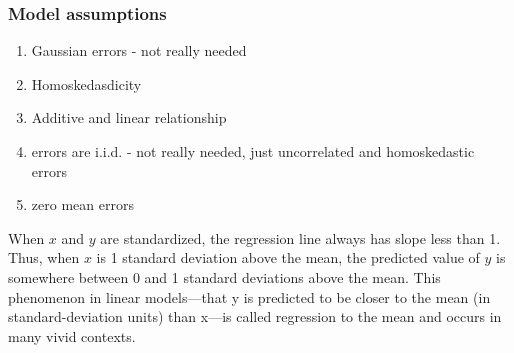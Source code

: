 \documentclass{article}
\begin{document}
\subsubsection{Model assumptions}
\begin{enumerate}
  \item Gaussian errors - not really needed
  \item Homoskedasdicity
  \item Additive and linear relationship
  \item errors are i.i.d. - not really needed, just uncorrelated and homoskedastic errors
  \item zero mean errors
\end{enumerate}

When $x$ and $y$ are standardized, the regression line always has slope less than 1.
Thus, when $x$ is 1 standard deviation above the mean, the predicted value of $y$ is somewhere between 0 and 1 standard deviations above the mean. This phenomenon in linear models—that y is predicted to be closer to the mean (in standard-deviation units) than x—is called regression to the mean and occurs in many vivid contexts.
\end{document}
